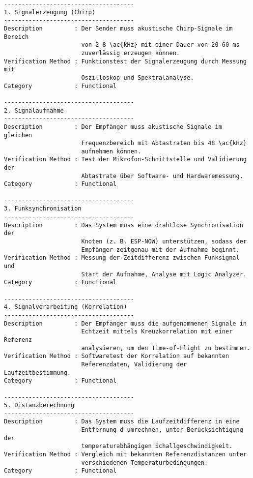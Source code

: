 \begin{verbatim}
-------------------------------------
1. Signalerzeugung (Chirp)
-------------------------------------
Description         : Der Sender muss akustische Chirp-Signale im Bereich 
                      von 2–8 \ac{kHz} mit einer Dauer von 20–60 ms 
                      zuverlässig erzeugen können.
Verification Method : Funktionstest der Signalerzeugung durch Messung mit 
                      Oszilloskop und Spektralanalyse.
Category            : Functional

-------------------------------------
2. Signalaufnahme
-------------------------------------
Description         : Der Empfänger muss akustische Signale im gleichen 
                      Frequenzbereich mit Abtastraten bis 48 \ac{kHz} 
                      aufnehmen können.
Verification Method : Test der Mikrofon-Schnittstelle und Validierung der 
                      Abtastrate über Software- und Hardwaremessung.
Category            : Functional

-------------------------------------
3. Funksynchronisation
-------------------------------------
Description         : Das System muss eine drahtlose Synchronisation der 
                      Knoten (z. B. ESP-NOW) unterstützen, sodass der 
                      Empfänger zeitgenau mit der Aufnahme beginnt.
Verification Method : Messung der Zeitdifferenz zwischen Funksignal und 
                      Start der Aufnahme, Analyse mit Logic Analyzer.
Category            : Functional

-------------------------------------
4. Signalverarbeitung (Korrelation)
-------------------------------------
Description         : Der Empfänger muss die aufgenommenen Signale in 
                      Echtzeit mittels Kreuzkorrelation mit einer Referenz 
                      analysieren, um den Time-of-Flight zu bestimmen.
Verification Method : Softwaretest der Korrelation auf bekannten 
                      Referenzdaten, Validierung der Laufzeitbestimmung.
Category            : Functional

-------------------------------------
5. Distanzberechnung
-------------------------------------
Description         : Das System muss die Laufzeitdifferenz in eine 
                      Entfernung d umrechnen, unter Berücksichtigung der 
                      temperaturabhängigen Schallgeschwindigkeit.
Verification Method : Vergleich mit bekannten Referenzdistanzen unter 
                      verschiedenen Temperaturbedingungen.
Category            : Functional


\end{verbatim}
